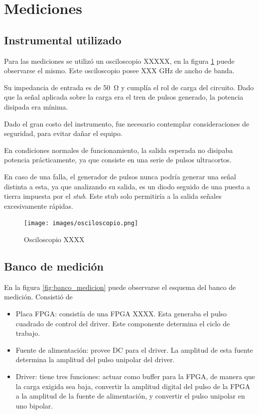 \section{Mediciones}

\subsection{Instrumental utilizado}

Para las mediciones se utilizó un osciloscopio XXXXX, en la figura
\ref{fig:osciloscopio} puede observarse el mismo. Este osciloscopio posee
XXX GHz de ancho de banda.

Su impedancia de entrada es de \qty{50}{\ohm} y cumplía el rol de carga del
circuito. Dado que la señal aplicada sobre la carga era el tren de pulsos
generado, la potencia disipada era mínima.

Dado el gran costo del instrumento, fue necesario contemplar consideraciones de
seguridad, para evitar dañar el equipo.

En condiciones normales de funcionamiento, la salida esperada no disipaba
potencia prácticamente, ya que consiste en una serie de pulsos ultracortos.

En caso de una falla, el generador de pulsos nunca podría generar una señal
distinta a esta, ya que analizando su salida, es un diodo seguido de una puesta
a tierra impuesta por el \textit{stub}. Este stub solo permitiría a la salida
señales excesivamente rápidas.

\begin{figure}
  \centering
    \texttt{[image: images/osciloscopio.png]}
    \caption{Osciloscopio XXXX}
    \label{fig:osciloscopio}
\end{figure}


\subsection{Banco de medición}

En la figura \ref{fig:banco_medicion} puede observarse el esquema del banco de
medición. Consistió de

\begin{itemize}
    \item{Placa FPGA: consistía de una FPGA XXXX. Esta generaba el pulso
        cuadrado de control del driver. Este componente determina el ciclo de
        trabajo.}
    \item{Fuente de alimentación: provee DC para el driver. La amplitud de esta
        fuente determina la amplitud del pulso unipolar del driver.}
    \item{Driver: tiene tres funciones: actuar como buffer para la FPGA, de
        manera que la carga exigida sea baja, convertir la amplitud digital del
        pulso de la FPGA a la amplitud de la fuente de alimentación, y convertir
        el pulso unipolar en uno bipolar.}
\end{itemize}

